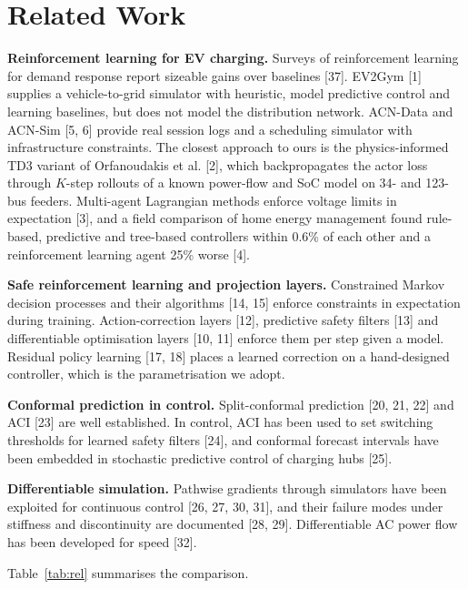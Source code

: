 \documentclass[11pt]{article}
\begin{document}
\section{Related Work}\label{sec:related}
\textbf{Reinforcement learning for EV charging.} Surveys of reinforcement learning for demand response report sizeable gains over baselines [37]. EV2Gym [1] supplies a vehicle-to-grid simulator with heuristic, model predictive control and learning baselines, but does not model the distribution network. ACN-Data and ACN-Sim [5, 6] provide real session logs and a scheduling simulator with infrastructure constraints. The closest approach to ours is the physics-informed TD3 variant of Orfanoudakis et al. [2], which backpropagates the actor loss through $K$-step rollouts of a known power-flow and SoC model on 34- and 123-bus feeders. Multi-agent Lagrangian methods enforce voltage limits in expectation [3], and a field comparison of home energy management found rule-based, predictive and tree-based controllers within 0.6\% of each other and a reinforcement learning agent 25\% worse [4].

\textbf{Safe reinforcement learning and projection layers.} Constrained Markov decision processes and their algorithms [14, 15] enforce constraints in expectation during training. Action-correction layers [12], predictive safety filters [13] and differentiable optimisation layers [10, 11] enforce them per step given a model. Residual policy learning [17, 18] places a learned correction on a hand-designed controller, which is the parametrisation we adopt.

\textbf{Conformal prediction in control.} Split-conformal prediction [20, 21, 22] and ACI [23] are well established. In control, ACI has been used to set switching thresholds for learned safety filters [24], and conformal forecast intervals have been embedded in stochastic predictive control of charging hubs [25].

\textbf{Differentiable simulation.} Pathwise gradients through simulators have been exploited for continuous control [26, 27, 30, 31], and their failure modes under stiffness and discontinuity are documented [28, 29]. Differentiable AC power flow has been developed for speed [32].

Table~\ref{tab:rel} summarises the comparison.
\end{document}

